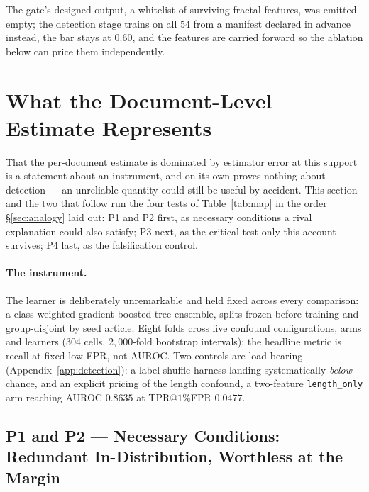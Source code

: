 \documentclass{article}
\newcommand{\arm}[1]{\texttt{#1}}
\begin{document}
The gate's designed output, a whitelist of surviving fractal features, was
emitted empty; the detection stage trains on all $54$ from a manifest declared
in advance instead, the bar stays at $0.60$, and the features are carried
forward so the ablation below can price them independently.

\section{What the Document-Level Estimate Represents}
\label{sec:consequences}

That the per-document estimate is dominated by estimator error at this
support is a statement about an instrument, and on its own proves nothing
about detection --- an unreliable quantity could still be useful by
accident. This section and the two that follow run the four tests of
Table~\ref{tab:map} in the order \S\ref{sec:analogy} laid out: P1 and P2
first, as necessary conditions a rival explanation could also satisfy; P3
next, as the critical test only this account survives; P4 last, as the
falsification control.

\paragraph{The instrument.}
The learner is deliberately unremarkable and held fixed across every
comparison: a class-weighted gradient-boosted tree ensemble, splits frozen
before training and group-disjoint by seed article. Eight folds cross five
confound configurations, arms and learners ($304$ cells,
$2{,}000$-fold bootstrap intervals);
the headline metric is recall at fixed low FPR, not AUROC. Two controls are
load-bearing (Appendix~\ref{app:detection}): a label-shuffle harness landing
systematically \emph{below} chance, and an explicit pricing of the length
confound, a two-feature \arm{length\_only} arm reaching AUROC $0.8635$ at
TPR@$1\%$FPR $0.0477$.

\subsection{P1 and P2 --- Necessary Conditions: Redundant In-Distribution, Worthless at the Margin}
\label{sec:p1}
\end{document}
